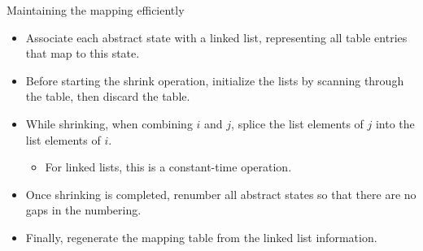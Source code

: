 \documentclass{gkibeamer}
\begin{document}
\begin{frame}{Maintaining the mapping efficiently}
  \begin{itemize}
  \item Associate each abstract state with a linked list, representing
    \alert{all table entries that map to this state}.
  \item Before starting the shrink operation, initialize the
    lists by scanning through the table, then \alert{discard the table}.
  \item While shrinking, when combining $i$ and $j$, \alert{splice the
    list elements of $j$ into the list elements of $i$}.
    \begin{itemize}
    \item For linked lists, this is a \alert{constant-time operation}.
    \end{itemize}
  \item Once shrinking is completed, renumber all abstract states so
    that there are no gaps in the numbering.
  \item Finally, regenerate the mapping table from the linked list
    information.
  \end{itemize}
\end{frame}
\end{document}
